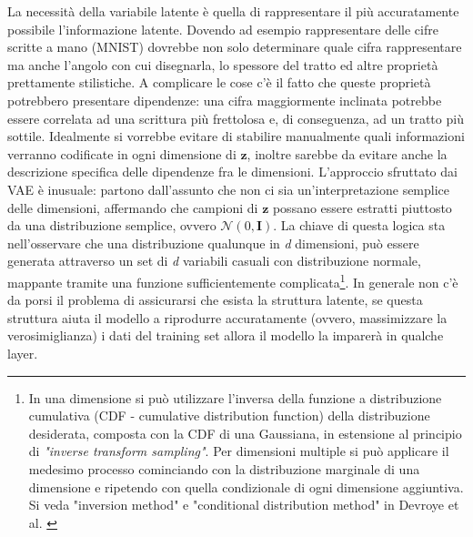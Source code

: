 La necessità della variabile latente è quella di rappresentare il più accuratamente possibile l'informazione latente. Dovendo ad esempio rappresentare delle cifre scritte a mano (MNIST) dovrebbe non solo determinare quale cifra rappresentare ma anche l'angolo con cui disegnarla, lo spessore del tratto ed altre proprietà prettamente stilistiche. A complicare le cose c'è il fatto che queste proprietà potrebbero presentare dipendenze: una cifra maggiormente inclinata potrebbe essere correlata ad una scrittura più frettolosa e, di conseguenza, ad un tratto più sottile. Idealmente si vorrebbe evitare di stabilire manualmente quali informazioni verranno codificate in ogni dimensione di $\boldsymbol{z}$, inoltre sarebbe da evitare anche la descrizione specifica delle dipendenze fra le dimensioni. L'approccio sfruttato dai VAE è inusuale: partono dall'assunto che non ci sia un'interpretazione semplice delle dimensioni, affermando che campioni di $\boldsymbol{z}$ possano essere estratti piuttosto da una distribuzione semplice, ovvero $\mathcal{N}(0, \boldsymbol{I})$. La chiave di questa logica sta nell'osservare che una distribuzione qualunque in \textit{d} dimensioni, può essere generata attraverso un set di \textit{d} variabili casuali con distribuzione normale, mappante tramite una funzione sufficientemente complicata\footnote{In una dimensione si può utilizzare l'inversa della funzione a distribuzione cumulativa (CDF - cumulative distribution function) della distribuzione desiderata, composta con la CDF di una Gaussiana, in estensione al principio di \textit{"inverse transform sampling"}. Per dimensioni multiple si può applicare il medesimo processo cominciando con la distribuzione marginale di una dimensione e ripetendo con quella condizionale di ogni dimensione aggiuntiva. Si veda "inversion method" e "conditional distribution method" in Devroye et al. \cite{rvg}}. In generale non c'è da porsi il problema di assicurarsi che esista la struttura latente, se questa struttura aiuta il modello a riprodurre accuratamente (ovvero, massimizzare la verosimiglianza) i dati del training set allora il modello la imparerà in qualche layer.

